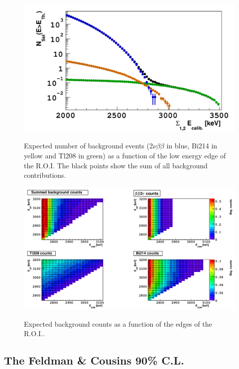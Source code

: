 \documentclass[main.tex]{subfiles}
\begin{document}
\begin{figure}[h!]
\centering
\includegraphics[scale=0.25]{pictures/Chap4/ExpectedNumberofEvent.png}
\label{ExpectedNumberofEvent.png}
\caption{Expected number of background events (2$\nu\beta\beta$ in blue, Bi214 in yellow and Tl208 in green) as a function of the low energy edge of the R.O.I. The black points show the sum of all background contributions.}
\end{figure}


\begin{figure}[h!]
\centering
\includegraphics[scale=0.4,  angle =90]{pictures/Chap4/BkgCount2D.png}
\label{BkgCount2D.png}
\caption{Expected background counts as a function of the edges of the R.O.I..}
\end{figure}


\FloatBarrier


\subsection{The Feldman \& Cousins 90\% C.L.}
 
\end{document}
